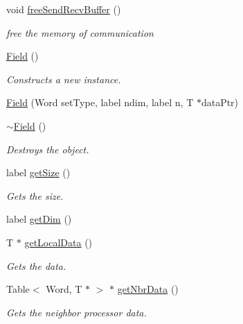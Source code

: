 \begin{DoxyCompactItemize}
void \hyperlink{classHSF_1_1Field_a646bc44e3bd328d6b6ead58f91ae662c}{freeSendRecvBuffer} ()
\begin{DoxyCompactList}\small\item\em free the memory of communication \item\end{DoxyCompactList}\item 
\hyperlink{classHSF_1_1Field_a67ca23ee998b8ec6ff61de5f714db4d6}{Field} ()
\begin{DoxyCompactList}\small\item\em Constructs a new instance. \item\end{DoxyCompactList}\item 
\hyperlink{classHSF_1_1Field_af76ece196c8cc0120f8d2eaa2eb2da16}{Field} (Word setType, label ndim, label n, T $\ast$dataPtr)
\item 
\hyperlink{classHSF_1_1Field_a7a1de4fe37f4483401a62dd7b410c577}{$\sim$Field} ()
\begin{DoxyCompactList}\small\item\em Destroys the object. \item\end{DoxyCompactList}\item 
label \hyperlink{classHSF_1_1Field_aad566df51a130e83b42ae93ea2958eb1}{getSize} ()
\begin{DoxyCompactList}\small\item\em Gets the size. \item\end{DoxyCompactList}\item 
label \hyperlink{classHSF_1_1Field_a2e8e21702b089d3ab3d41fa24353f31d}{getDim} ()
\item 
T $\ast$ \hyperlink{classHSF_1_1Field_a737e777234950a28e98c42aebbdc8f32}{getLocalData} ()
\begin{DoxyCompactList}\small\item\em Gets the data. \item\end{DoxyCompactList}\item 
Table$<$ Word, T $\ast$ $>$ $\ast$ \hyperlink{classHSF_1_1Field_ab0af91c5a716e649d43e796d589bf69d}{getNbrData} ()
\begin{DoxyCompactList}\small\item\em Gets the neighbor processor data. \item\end{DoxyCompactList}\item 

\end{DoxyCompactItemize}
